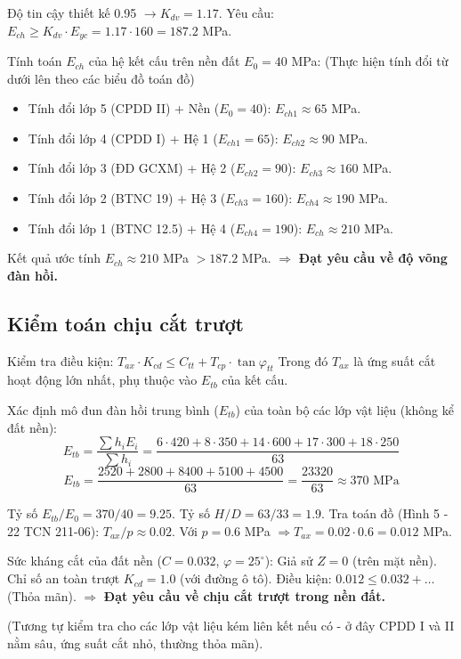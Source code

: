 Độ tin cậy thiết kế 0.95 $\to K_{dv} = 1.17$.
Yêu cầu: $E_{ch} \ge K_{dv} \cdot E_{yc} = 1.17 \cdot 160 = 187.2$ MPa.

Tính toán $E_{ch}$ của hệ kết cấu trên nền đất $E_0 = 40$ MPa:
(Thực hiện tính đổi từ dưới lên theo các biểu đồ toán đồ)

\begin{itemize}
    \item Tính đổi lớp 5 (CPDD II) + Nền ($E_0=40$): $E_{ch1} \approx 65$ MPa.
    \item Tính đổi lớp 4 (CPDD I) + Hệ 1 ($E_{ch1}=65$): $E_{ch2} \approx 90$ MPa.
    \item Tính đổi lớp 3 (ĐD GCXM) + Hệ 2 ($E_{ch2}=90$): $E_{ch3} \approx 160$ MPa.
    \item Tính đổi lớp 2 (BTNC 19) + Hệ 3 ($E_{ch3}=160$): $E_{ch4} \approx 190$ MPa.
    \item Tính đổi lớp 1 (BTNC 12.5) + Hệ 4 ($E_{ch4}=190$): $E_{ch} \approx 210$ MPa.
\end{itemize}

Kết quả ước tính $E_{ch} \approx 210$ MPa $> 187.2$ MPa.
$\Rightarrow$ \textbf{Đạt yêu cầu về độ võng đàn hồi.}

\subsection{Kiểm toán chịu cắt trượt}
Kiểm tra điều kiện: $T_{ax} \cdot K_{cd} \le C_{tt} + T_{cp} \cdot \tan\varphi_{tt}$
Trong đó $T_{ax}$ là ứng suất cắt hoạt động lớn nhất, phụ thuộc vào $E_{tb}$ của kết cấu.

Xác định mô đun đàn hồi trung bình ($E_{tb}$) của toàn bộ các lớp vật liệu (không kể đất nền):
$$ E_{tb} = \frac{\sum h_i E_i}{\sum h_i} = \frac{6\cdot 420 + 8\cdot 350 + 14\cdot 600 + 17\cdot 300 + 18\cdot 250}{63} $$
$$ E_{tb} = \frac{2520 + 2800 + 8400 + 5100 + 4500}{63} = \frac{23320}{63} \approx 370 \text{ MPa} $$

Tỷ số $E_{tb}/E_0 = 370/40 = 9.25$.
Tỷ số $H/D = 63/33 = 1.9$.
Tra toán đồ (Hình 5 - 22 TCN 211-06): $T_{ax}/p \approx 0.02$.
Với $p = 0.6$ MPa $\Rightarrow T_{ax} = 0.02 \cdot 0.6 = 0.012$ MPa.

Sức kháng cắt của đất nền ($C=0.032$, $\varphi=25^\circ$):
Giả sử $Z = 0$ (trên mặt nền).
Chỉ số an toàn trượt $K_{cd} = 1.0$ (với đường ô tô).
Điều kiện: $0.012 \le 0.032 + \dots$ (Thỏa mãn).
$\Rightarrow$ \textbf{Đạt yêu cầu về chịu cắt trượt trong nền đất.}

(Tương tự kiểm tra cho các lớp vật liệu kém liên kết nếu có - ở đây CPDD I và II nằm sâu, ứng suất cắt nhỏ, thường thỏa mãn).

